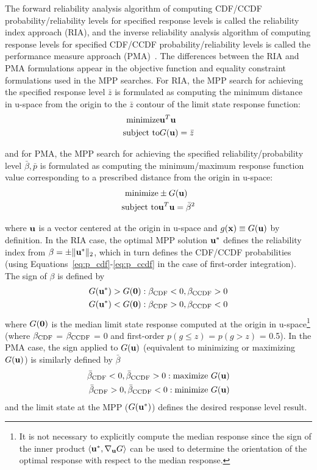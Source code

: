 The forward reliability analysis algorithm of computing CDF/CCDF
probability/reliability levels for specified response levels is called
the reliability index approach (RIA), and the inverse reliability
analysis algorithm of computing response levels for specified CDF/CCDF
probability/reliability levels is called the performance measure
approach (PMA)~\cite{Tu99}.  The differences between the RIA and PMA
formulations appear in the objective function and equality constraint
formulations used in the MPP searches.  For RIA, the MPP search for
achieving the specified response level $\bar{z}$ is formulated as
computing the minimum distance in u-space from the origin to the
$\bar{z}$ contour of the limit state response function:
\begin{eqnarray}
{\rm minimize}     & {\bf u}^T {\bf u} \nonumber \\
{\rm subject \ to} & G({\bf u}) = \bar{z} \label{eq:ria_opt}
\end{eqnarray}

and for PMA, the MPP search for achieving the specified
reliability/probability level $\bar{\beta},\bar{p}$ is formulated as
computing the minimum/maximum response function value corresponding
to a prescribed distance from the origin in u-space:
\begin{eqnarray}
{\rm minimize}     & \pm G({\bf u}) \nonumber \\
{\rm subject \ to} & {\bf u}^T {\bf u} = \bar{\beta}^2 \label{eq:pma_opt}
\end{eqnarray}

where ${\bf u}$ is a vector centered at the origin in 
u-space and $g({\bf x}) \equiv G({\bf u})$ by definition.  In the RIA
case, the optimal MPP solution ${\bf u}^*$ defines the reliability 
index from $\beta = \pm \|{\bf u}^*\|_2$, which in turn defines the 
CDF/CCDF probabilities (using Equations~\ref{eq:p_cdf}-\ref{eq:p_ccdf} in 
the case of first-order integration).  The sign of $\beta$ is defined by
\begin{eqnarray}
G({\bf u}^*) > G({\bf 0}): \beta_{\rm CDF} < 0, \beta_{\rm CCDF} > 0 \\
G({\bf u}^*) < G({\bf 0}): \beta_{\rm CDF} > 0, \beta_{\rm CCDF} < 0
\end{eqnarray}
\noindent where $G({\bf 0})$ is the median limit state response computed 
at the origin in u-space\footnote{It is not necessary to explicitly compute
the median response since the sign of the inner product 
$\langle {\bf u}^*, \nabla_{\bf u} G \rangle$
can be used to determine the orientation of the optimal response with 
respect to the median response.} (where $\beta_{\rm CDF}$ = $\beta_{\rm CCDF}$ = 0 
and first-order $p(g \le z)$ = $p(g > z)$ = 0.5).  In the PMA case, the 
sign applied to $G({\bf u})$ (equivalent to minimizing or maximizing 
$G({\bf u})$) is similarly defined by $\bar{\beta}$
\begin{eqnarray}
\bar{\beta}_{\rm CDF} < 0, \bar{\beta}_{\rm CCDF} > 0: {\rm maximize \ } G({\bf u}) \\
\bar{\beta}_{\rm CDF} > 0, \bar{\beta}_{\rm CCDF} < 0: {\rm minimize \ } G({\bf u})
\end{eqnarray}
and the limit state at the MPP ($G({\bf u}^*)$) defines the desired
response level result.

